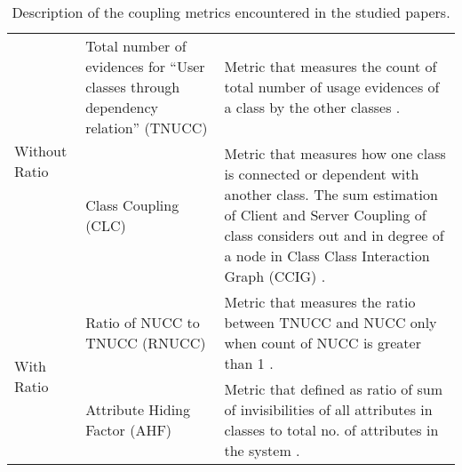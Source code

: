 \begin{table*}[t]
\begin{tabular}{p{2cm} p{4cm} p{10cm}}
         \midrule
            \multirow[p]{2}{*}{Without Ratio} & Total number of evidences for “User classes through dependency relation” (TNUCC) & Metric that measures the count of total number of usage evidences of a class by the other classes \cite{s23_coupling}. \\
             \cmidrule(rl){2-3} & Class Coupling (CLC) & Metric that measures how one class is connected or dependent with another class. The sum estimation of Client and Server Coupling of class considers out and in degree of a node in Class Class Interaction Graph (CCIG)  \cite{s23_coupling}.\\
            
        \midrule
            \multirow[p]{4}{*}{With Ratio} & Ratio of NUCC to TNUCC (RNUCC) & Metric that measures the ratio between TNUCC and NUCC only when count of NUCC is greater than 1  \cite{s23_coupling}. \\
             \cmidrule(rl){2-3} & Attribute Hiding Factor (AHF) & Metric that defined as ratio of sum of invisibilities of all attributes in classes to total no. of attributes in the system  \cite{s23_coupling}.\\
        
        \bottomrule
    \end{tabular}
    \caption{Description of the coupling metrics encountered in the studied papers.}
    \label{table:coupling_metrics}
\end{table*}